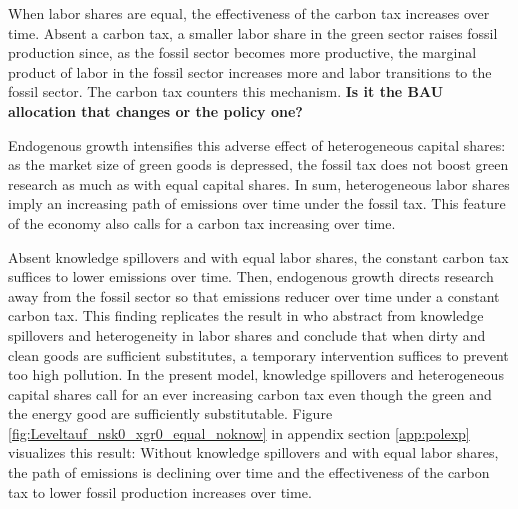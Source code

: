 When labor shares are equal, the effectiveness of the carbon tax increases over time. 
Absent a carbon tax, a smaller labor share in the green sector raises fossil production since, as the fossil sector becomes more productive, the marginal product of labor in the fossil sector increases more and labor transitions to the fossil sector. The carbon tax counters this mechanism. \textbf{Is it the BAU allocation that changes or the policy one?} %

Endogenous growth intensifies this adverse effect of heterogeneous capital shares: as the market size of green goods is depressed, the fossil tax does not boost green research as much as with equal capital shares. In sum, heterogeneous labor shares imply an increasing path of emissions over time under the fossil tax. %
This feature of the economy also calls for a carbon tax increasing over time.
 
 
 Absent knowledge spillovers and with equal labor shares, the constant carbon tax suffices to lower emissions over time. Then, endogenous growth directs research away from the fossil sector so that emissions reducer over time under a constant carbon tax. 
 This finding replicates the result in \cite{Acemoglu2012TheChange} who abstract from knowledge spillovers and heterogeneity in labor shares and conclude that when dirty and clean goods are sufficient substitutes, a temporary intervention suffices to prevent too high pollution. In the present model, knowledge spillovers and heterogeneous capital shares 
 call for an ever increasing carbon tax even though the green and the energy good are sufficiently substitutable. Figure \ref{fig:Leveltauf_nsk0_xgr0_equal_noknow} in appendix section \ref{app:polexp}  visualizes this result: Without knowledge spillovers and with equal labor shares, the path of emissions is declining over time and the effectiveness of the carbon tax to lower fossil production increases over time. 
 

